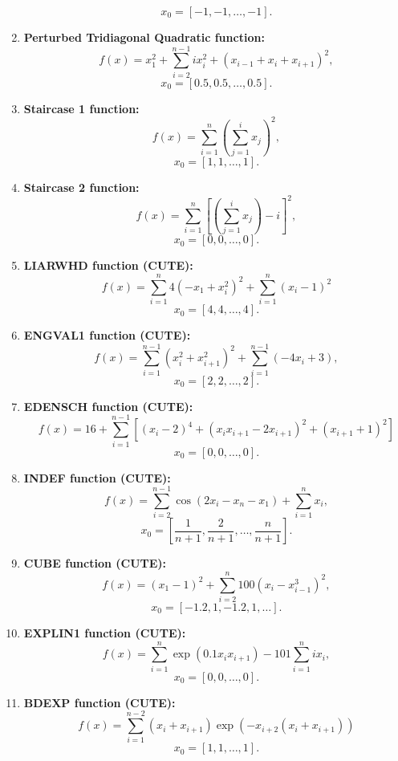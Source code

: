 \documentclass[10pt]{article}
\begin{document}
\begin{enumerate}
    \[
    x_0 = [-1, -1, \ldots, -1].
    \]

    \item \textbf{Perturbed Tridiagonal Quadratic function:}
    \[
    f(x) = x_1^2 + \sum_{i=2}^{n-1} i x_i^2 + (x_{i-1} +  x_i + x_{i+1})^2,
    \]
    \[
    x_0 = [0.5, 0.5, \dots, 0.5].
    \]

    \item \textbf{Staircase 1 function:}
    \[
    f(x) = \sum_{i=1}^{n} \left( \sum_{j=1}^{i} x_j \right)^2,
    \]
    \[
    x_0 = [1, 1, \dots, 1].
    \]

    \item \textbf{Staircase 2 function:}
    \[
    f(x) = \sum_{i=1}^{n}\left[\left( \sum_{j=1}^{i}  x_j\right) - i \right]^2,
    \]
    \[
    x_0 = [0, 0, \dots, 0].
    \]

    \item \textbf{LIARWHD function (CUTE):}
    \[
    f(x) = \sum_{i=1}^n 4(-x_1 + x_i^2)^2 + \sum_{i=1}^n(x_i - 1)^2
    \]
    \[
    x_0 = [4, 4, \dots, 4].
    \]


    \item \textbf{ENGVAL1 function (CUTE):}
    \[
    f(x) = \sum_{i=1}^{n-1} \left( x_i^2 + x_{i+1}^2\right)^2 + \sum_{i=1}^{n-1} \left( -4 x_i + 3 \right),
    \]
    \[
    x_0 = [2, 2, \dots, 2].
    \]


    \item \textbf{EDENSCH function (CUTE):}
    \[
    f(x) = 16 + \sum_{i=1}^{n-1} \left[ (x_i - 2)^4 + (x_i x_{i+1} - 2x_{i+1})^2 + (x_{i+1} + 1)^2\right]
    \]
    \[
    x_0 = [0, 0, \dots, 0].
    \]

    \item \textbf{INDEF function (CUTE):}
    \[
    f(x) = \sum_{i=2}^{n-1} \cos(2x_i - x_n - x_1) + \sum_{i=1}^{n} x_i,
    \]
    \[
    x_0 = \left[ \frac{1}{n+1}, \frac{2}{n+1}, \dots, \frac{n}{n+1} \right].
    \]

    \item \textbf{CUBE function (CUTE):}
    \[
    f(x) = (x_1 - 1)^2 + \sum_{i=2}^{n} 100 \left( x_i - x_{i-1}^3 \right)^2,
    \]
    \[
    x_0 = [-1.2, 1, -1.2, 1, \dots].
    \]

    \item \textbf{EXPLIN1 function (CUTE):}
    \[
    f(x) = \sum_{i=1}^{n} \exp(0.1 x_ix_{i+1}) - 101 \sum_{i=1}^n ix_i,
    \]
    \[
    x_0 = [0, 0, \dots, 0].
    \]


    \item \textbf{BDEXP function (CUTE):}
    \[
    f(x) = \sum_{i=1}^{n-2} (x_i + x_{i+1}) \exp(-x_{i+2}(x_i + x_{i+1}))
    \]
    \[
    x_0 = [1, 1, \dots, 1].
    \]


\end{enumerate}
\end{document}
